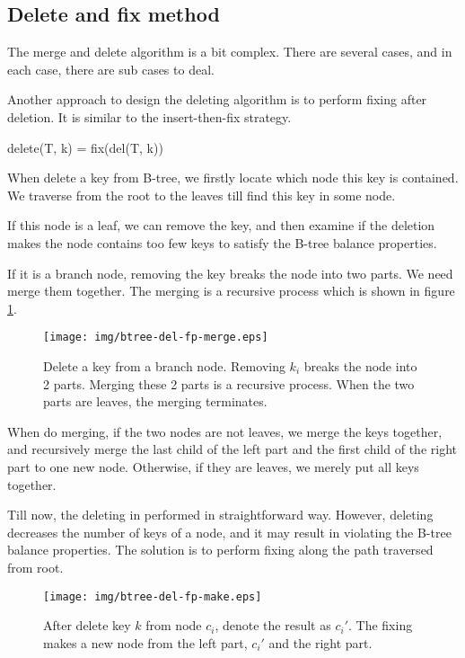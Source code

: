\documentclass[UTF8]{article}
\begin{document}
\subsection{Delete and fix method}

The merge and delete algorithm is a bit complex.
There are several cases, and in each case, there are sub cases to deal.

Another approach to design the deleting algorithm is to perform fixing
after deletion. It is similar to the insert-then-fix strategy.

\be
delete(T, k) = fix(del(T, k))
\ee

When delete a key from B-tree, we firstly locate
which node this key is contained. We traverse
from the root to the leaves till find this key in some node.

If this node is a leaf, we can remove the key, and then
examine if the deletion makes the node contains too few keys to
satisfy the B-tree balance properties.

If it is a branch node, removing the key breaks the node into
two parts. We need merge them together. The merging is a recursive
process which is shown in figure \ref{fig:del-fp-merge}.

\begin{figure}[htbp]
  \centering
  \texttt{[image: img/btree-del-fp-merge.eps]}
  \caption{Delete a key from a branch node. Removing $k_i$ breaks
the node into 2 parts. Merging these 2 parts
is a recursive process. When the two parts are leaves, the merging
terminates.} \label{fig:del-fp-merge}
\end{figure}

When do merging, if the two nodes are not leaves, we merge the keys
together, and recursively merge the last child of the left part
and the first child of the right part to one new node. Otherwise,
if they are leaves, we merely put all keys together.

Till now, the deleting in performed in straightforward way. However, deleting
decreases the number of keys of a node, and it may result in
violating the B-tree balance properties. The solution is to perform
fixing along the path traversed from root.

\begin{figure}[htbp]
  \centering
  \texttt{[image: img/btree-del-fp-make.eps]}
  \caption{After delete key $k$ from node $c_i$, denote the result
as $c_i'$. The fixing makes a new node from the
left part, $c_i'$ and the right part.}
  \label{fig:del-fp-make}
\end{figure}
\end{document}
